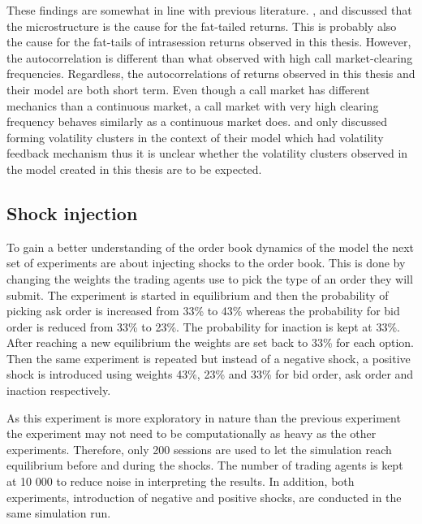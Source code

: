 These findings are somewhat in line with previous literature. \citet{Genoa01}, \citet{Raberto05} and \citet{LIU20082535} 
discussed that the microstructure is the cause for the fat-tailed returns. This is probably also the cause for the
fat-tails of intrasession returns observed in this thesis. However, the autocorrelation is different than what \citet{LIU20082535} 
observed with high call market-clearing frequencies. Regardless, the autocorrelations of returns observed in this thesis and their model
are both short term. Even though a call market has different mechanics than a continuous market, a call market with
very high clearing frequency behaves similarly as a continuous market does. \citet{Genoa01} and \citet{Raberto05} only discussed
forming volatility clusters in the context of their model which had volatility feedback mechanism thus it is unclear
whether the volatility clusters observed in the model created in this thesis are to be expected.

\subsection{Shock injection}

To gain a better understanding of the order book dynamics of the model the next set of experiments are about injecting shocks 
to the order book. This is done by changing the weights the trading agents use to pick the type of an order they will submit. 
The experiment is started in equilibrium and then the probability of picking ask order is increased from 33\% to 43\% 
whereas the probability for bid order is reduced from 33\% to 23\%. The probability for inaction is kept at 33\%. 
After reaching a new equilibrium the weights are set back to 33\% for each option. Then the same experiment is repeated 
but instead of a negative shock, a positive shock is introduced using weights 43\%, 23\% and 33\% for bid order, ask order 
and inaction respectively. 

As this experiment is more exploratory in nature than the previous experiment the experiment may not need to be computationally
as heavy as the other experiments. Therefore, only 200 sessions are used to let the simulation reach equilibrium before and during 
the shocks. The number of trading agents is kept at 10 000 to reduce noise in interpreting the results. In addition, both experiments, 
introduction of negative and positive shocks, are conducted in the same simulation run.

